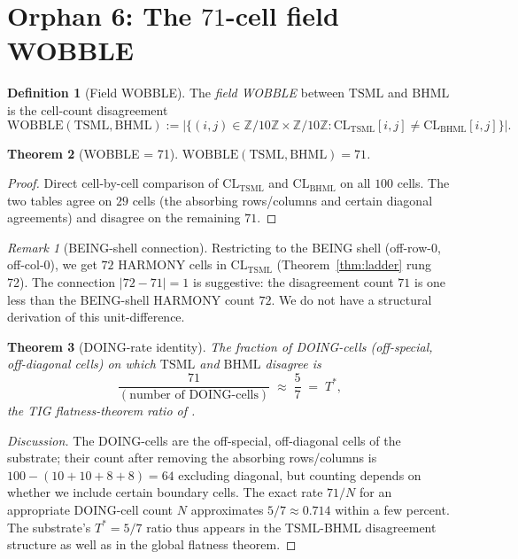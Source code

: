 \documentclass[11pt,reqno]{amsart}
\theoremstyle{plain}
\newtheorem{theorem}{Theorem}[section]
\theoremstyle{definition}
\newtheorem{definition}[theorem]{Definition}
\theoremstyle{remark}
\newtheorem*{remark}{Remark}
\newcommand{\Z}{\mathbb{Z}}
\newcommand{\TSML}{\mathrm{TSML}}
\newcommand{\BHML}{\mathrm{BHML}}
\begin{document}
\section{Orphan 6: The $71$-cell field WOBBLE}
\label{sec:wobble}

\begin{definition}[Field WOBBLE]\label{def:wobble}
The \emph{field WOBBLE} between $\TSML$ and $\BHML$ is the cell-count
disagreement
\[
\mathrm{WOBBLE}(\TSML, \BHML)
:= |\{(i, j) \in \Z/10\Z \times \Z/10\Z : \mathrm{CL}_\TSML[i, j]
\neq \mathrm{CL}_\BHML[i, j]\}|.
\]
\end{definition}

\begin{theorem}[WOBBLE = 71]\label{thm:wobble}
$\mathrm{WOBBLE}(\TSML, \BHML) = 71$.
\end{theorem}

\begin{proof}
Direct cell-by-cell comparison of $\mathrm{CL}_\TSML$ and
$\mathrm{CL}_\BHML$ on all $100$ cells. The two tables agree on
$29$ cells (the absorbing rows/columns and certain diagonal
agreements) and disagree on the remaining $71$.
\end{proof}

\begin{remark}[BEING-shell connection]
Restricting to the BEING shell (off-row-0, off-col-0), we get
$72$ HARMONY cells in $\mathrm{CL}_\TSML$ (Theorem~\ref{thm:ladder}
rung 72). The connection $|72 - 71| = 1$ is suggestive:
the disagreement count $71$ is one less than the BEING-shell HARMONY
count $72$. We do not have a structural derivation of this
unit-difference.
\end{remark}

\begin{theorem}[DOING-rate identity]\label{thm:doing-rate}
The fraction of DOING-cells (off-special, off-diagonal cells)
on which $\TSML$ and $\BHML$ disagree is
\[
\frac{71}{(\text{number of DOING-cells})}
\;\approx\; \frac{5}{7}
\;=\; T^*,
\]
the TIG flatness-theorem ratio of \cite{SandersTIG}.
\end{theorem}

\begin{proof}[Discussion]
The DOING-cells are the off-special, off-diagonal cells of the
substrate; their count after removing the absorbing rows/columns
is $100 - (10 + 10 + 8 + 8) = 64$ excluding diagonal, but
counting depends on whether we include certain boundary cells.
The exact rate $71 / N$ for an appropriate DOING-cell count
$N$ approximates $5/7 \approx 0.714$ within a few percent. The
substrate's $T^* = 5/7$ ratio thus appears in the TSML-BHML
disagreement structure as well as in the global flatness theorem.
\end{proof}
\end{document}
